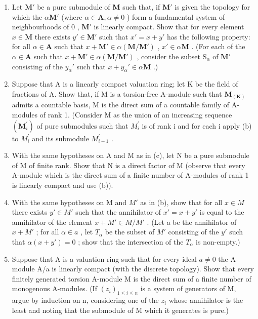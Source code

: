 \begin{enumerate}
\def\labelenumi{(\alph{enumi})}
\setcounter{enumi}{1}
\item
  Let \(\mathbf{M}'\) be a pure submodule of \(\mathbf{M}\) such that, if \(\mathbf{M}'\) is given the topology for which the \(\alpha\mathbf{M}'\) (where \(\alpha \in \mathbf{A}, \alpha \neq 0\) ) form a fundamental system of neighbourhoods of \(0\) , \(\mathbf{M}'\) is linearly compact. Show that for every element \(x \in \mathbf{M}\) there exists \(y' \in \mathbf{M}'\) such that \(x' = x + y'\) has the following property: for all \(\alpha \in \mathbf{A}\) such that \(x + \mathbf{M}' \in \alpha(\mathbf{M} / \mathbf{M}')\) , \(x' \in \alpha\mathbf{M}\) . (For each of the \(\alpha \in \mathbf{A}\) such that \(x + \mathbf{M}' \in \alpha(\mathbf{M} / \mathbf{M}')\) , consider the subset \(\mathrm{S}_{\alpha}\) of \(\mathbf{M}'\) consisting of the \(y_{\alpha}'\) such that \(x + y_{\alpha}' \in \alpha\mathbf{M}\) .)
\item
  Suppose that A is a linearly compact valuation ring; let K be the field of fractions of A. Show that, if M is a torsion-free A-module such that \(\mathbf{M}_{(\mathbf{K})}\) admits a countable basis, M is the direct sum of a countable family of A-modules of rank 1. (Consider M as the union of an increasing sequence \((\mathbf{M}_{i}^{\prime})\) of pure submodules such that \(M_{i}^{\prime}\) is of rank i and for each i apply (b) to \(M_{i}^{\prime}\) and its submodule \(M_{i-1}^{\prime}\) .
\item
  With the same hypotheses on A and M as in (c), let N be a pure submodule of M of finite rank. Show that N is a direct factor of M (observe that every A-module which is the direct sum of a finite number of A-modules of rank 1 is linearly compact and use (b)).
\item
  With the same hypotheses on M and \(M'\) as in (b), show that for all \(x \in M\) there exists \(y' \in M'\) such that the annihilator of \(x' = x + y'\) is equal to the annihilator of the element \(x + M' \in M/M'\) . (Let a be the annihilator of \(x + M'\) ; for all \(\alpha \in a\) , let \(T_{\alpha}\) be the subset of \(M'\) consisting of the \(y'\) such that \(\alpha(x + y') = 0\) ; show that the intersection of the \(T_{\alpha}\) is non-empty.)
\item
  Suppose that A is a valuation ring such that for every ideal \(a \neq 0\) the A-module A/a is linearly compact (with the discrete topology). Show that every finitely generated torsion A-module M is the direct sum of a finite number of monogenous A-modules. (If \((z_{i})_{1 \leqslant i \leqslant n}\) is a system of generators of M, argue by induction on n, considering one of the \(z_{i}\) whose annihilator is the least and noting that the submodule of M which it generates is pure.)
\end{enumerate}

